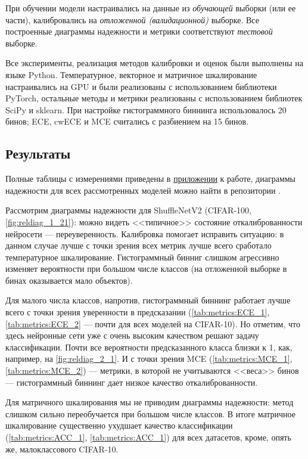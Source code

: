 \documentclass[12pt]{article}
\begin{document}
При обучении модели настраивались на данные из \emph{обучающей} выборки (или ее части), калибровались на \emph{отложенной (валидационной)} выборке. Все построенные диаграммы надежности и метрики соответствуют \emph{тестовой} выборке.

Все эксперименты, реализация методов калибровки и оценок были выполнены на языке Python. Температурное, векторное и матричное шкалирование настраивались на GPU и были реализованы с использованием библиотеки PyTorch, остальные методы и метрики реализованы с использованием библиотек SciPy и sklearn. При настройке гистограммного биннинга использовалось 20 бинов; ECE, cwECE и MCE считались с разбиением на 15 бинов.

\subsection{Результаты}
Полные таблицы с измерениями приведены в 
\hyperref[sec:appendix]{приложении} к работе, диаграммы надежности для всех рассмотренных моделей можно найти в репозитории \cite{my_repo}.

Рассмотрим диаграммы надежности для ShuffleNetV2 (CIFAR-100, \autoref{fig:reldiag_1_21}): можно видеть <<типичное>> состояние откалиброванности нейросети --- переуверенность. Калибровка помогает исправить ситуацию: в данном случае лучше с точки зрения всех метрик лучше всего сработало температурное шкалирование. Гистограммный бинниг слишком агрессивно изменяет вероятности при большом числе классов (на отложенной выборке в бинах оказывается мало объектов).

Для малого числа классов, напротив, гистограммный биннинг работает лучше всего с точки зрения уверенности в предсказании (\autoref{tab:metrics:ECE_1}, \autoref{tab:metrics:ECE_2} --- почти для всех моделей на CIFAR-10). Но отметим, что здесь нейронные сети уже с очень высоким качеством решают задачу классификации. Почти все вероятности предсказанного класса близки к 1, как, например, на \autoref{fig:reldiag_2_1}. И с точки зрения MCE (\autoref{tab:metrics:MCE_1}, \autoref{tab:metrics:MCE_2}) --- метрики, в которой не учитываются <<веса>> бинов --- гистограммный биннинг дает низкое качество откалиброванности.

Для матричного шкалирования мы не приводим диаграммы надежности: метод слишком сильно переобучается при большом числе классов. В итоге матричное шкалирование существенно ухудшает качество классификации (\autoref{tab:metrics:ACC_1}, \autoref{tab:metrics:ACC_1}) для всех датасетов, кроме, опять же, малоклассового CIFAR-10.
\end{document}
